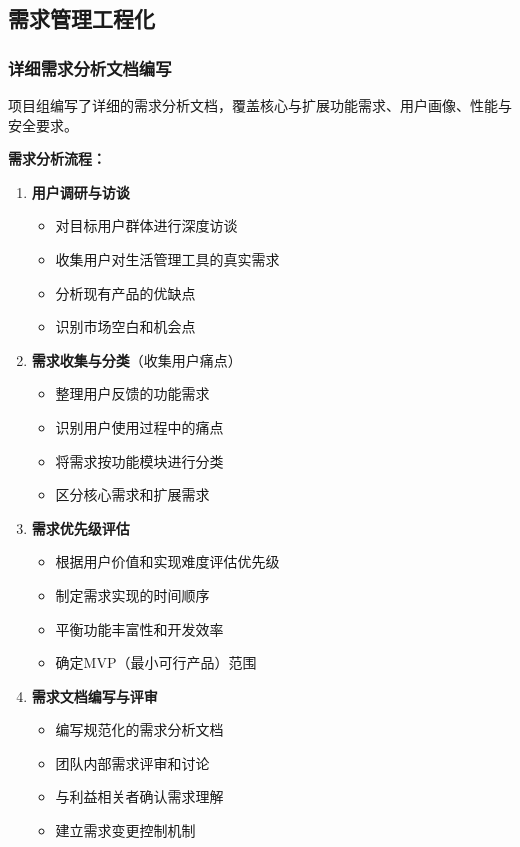 \documentclass[a4paper]{article}
\begin{document}
\subsection{需求管理工程化}

\subsubsection{详细需求分析文档编写}

项目组编写了详细的需求分析文档，覆盖核心与扩展功能需求、用户画像、性能与安全要求。

\textbf{需求分析流程：}
\begin{enumerate}
    \item \textbf{用户调研与访谈}
    \begin{itemize}
        \item 对目标用户群体进行深度访谈
        \item 收集用户对生活管理工具的真实需求
        \item 分析现有产品的优缺点
        \item 识别市场空白和机会点
    \end{itemize}
    \item \textbf{需求收集与分类}（收集用户痛点）
    \begin{itemize}
        \item 整理用户反馈的功能需求
        \item 识别用户使用过程中的痛点
        \item 将需求按功能模块进行分类
        \item 区分核心需求和扩展需求
    \end{itemize}
    \item \textbf{需求优先级评估}
    \begin{itemize}
        \item 根据用户价值和实现难度评估优先级
        \item 制定需求实现的时间顺序
        \item 平衡功能丰富性和开发效率
        \item 确定MVP（最小可行产品）范围
    \end{itemize}
    \item \textbf{需求文档编写与评审}
    \begin{itemize}
        \item 编写规范化的需求分析文档
        \item 团队内部需求评审和讨论
        \item 与利益相关者确认需求理解
        \item 建立需求变更控制机制
    \end{itemize}
\end{enumerate}
\end{document}
